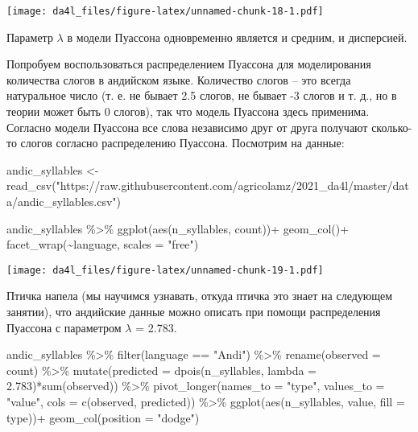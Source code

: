 \documentclass[
]{book}
\newenvironment{Shaded}{\begin{snugshade}}{\end{snugshade}}
\newcommand{\AttributeTok}[1]{\textcolor[rgb]{0.77,0.63,0.00}{#1}}
\newcommand{\FloatTok}[1]{\textcolor[rgb]{0.00,0.00,0.81}{#1}}
\newcommand{\FunctionTok}[1]{\textcolor[rgb]{0.00,0.00,0.00}{#1}}
\newcommand{\NormalTok}[1]{#1}
\newcommand{\OtherTok}[1]{\textcolor[rgb]{0.56,0.35,0.01}{#1}}
\newcommand{\SpecialCharTok}[1]{\textcolor[rgb]{0.00,0.00,0.00}{#1}}
\newcommand{\StringTok}[1]{\textcolor[rgb]{0.31,0.60,0.02}{#1}}
\begin{document}
\texttt{[image: da4l\_files/figure-latex/unnamed-chunk-18-1.pdf]}

Параметр \(\lambda\) в модели Пуассона одновременно является и средним, и дисперсией.

Попробуем воспользоваться распределением Пуассона для моделирования количества слогов в андийском языке. Количество слогов -- это всегда натуральное число (т. е. не бывает 2.5 слогов, не бывает -3 слогов и т. д., но в теории может быть 0 слогов), так что модель Пуассона здесь применима. Согласно модели Пуассона все слова независимо друг от друга получают сколько-то слогов согласно распределению Пуассона. Посмотрим на данные:

\begin{Shaded}
\begin{Highlighting}[]
\NormalTok{andic\_syllables }\OtherTok{\textless{}{-}} \FunctionTok{read\_csv}\NormalTok{(}\StringTok{"https://raw.githubusercontent.com/agricolamz/2021\_da4l/master/data/andic\_syllables.csv"}\NormalTok{) }

\NormalTok{andic\_syllables }\SpecialCharTok{\%\textgreater{}\%} 
  \FunctionTok{ggplot}\NormalTok{(}\FunctionTok{aes}\NormalTok{(n\_syllables, count))}\SpecialCharTok{+}
  \FunctionTok{geom\_col}\NormalTok{()}\SpecialCharTok{+}
  \FunctionTok{facet\_wrap}\NormalTok{(}\SpecialCharTok{\textasciitilde{}}\NormalTok{language, }\AttributeTok{scales =} \StringTok{"free"}\NormalTok{)}
\end{Highlighting}
\end{Shaded}

\texttt{[image: da4l\_files/figure-latex/unnamed-chunk-19-1.pdf]}

Птичка напела (мы научимся узнавать, откуда птичка это знает на следующем занятии), что андийские данные можно описать при помощи распределения Пуассона с параметром \(\lambda\) = 2.783.

\begin{Shaded}
\begin{Highlighting}[]
\NormalTok{andic\_syllables }\SpecialCharTok{\%\textgreater{}\%} 
  \FunctionTok{filter}\NormalTok{(language }\SpecialCharTok{==} \StringTok{"Andi"}\NormalTok{) }\SpecialCharTok{\%\textgreater{}\%} 
  \FunctionTok{rename}\NormalTok{(}\AttributeTok{observed =}\NormalTok{ count) }\SpecialCharTok{\%\textgreater{}\%} 
  \FunctionTok{mutate}\NormalTok{(}\AttributeTok{predicted =} \FunctionTok{dpois}\NormalTok{(n\_syllables, }\AttributeTok{lambda =} \FloatTok{2.783}\NormalTok{)}\SpecialCharTok{*}\FunctionTok{sum}\NormalTok{(observed)) }\SpecialCharTok{\%\textgreater{}\%} 
  \FunctionTok{pivot\_longer}\NormalTok{(}\AttributeTok{names\_to =} \StringTok{"type"}\NormalTok{, }\AttributeTok{values\_to =} \StringTok{"value"}\NormalTok{, }\AttributeTok{cols =} \FunctionTok{c}\NormalTok{(observed, predicted)) }\SpecialCharTok{\%\textgreater{}\%} 
  \FunctionTok{ggplot}\NormalTok{(}\FunctionTok{aes}\NormalTok{(n\_syllables, value, }\AttributeTok{fill =}\NormalTok{ type))}\SpecialCharTok{+}
  \FunctionTok{geom\_col}\NormalTok{(}\AttributeTok{position =} \StringTok{"dodge"}\NormalTok{)}
\end{Highlighting}
\end{Shaded}
\end{document}
